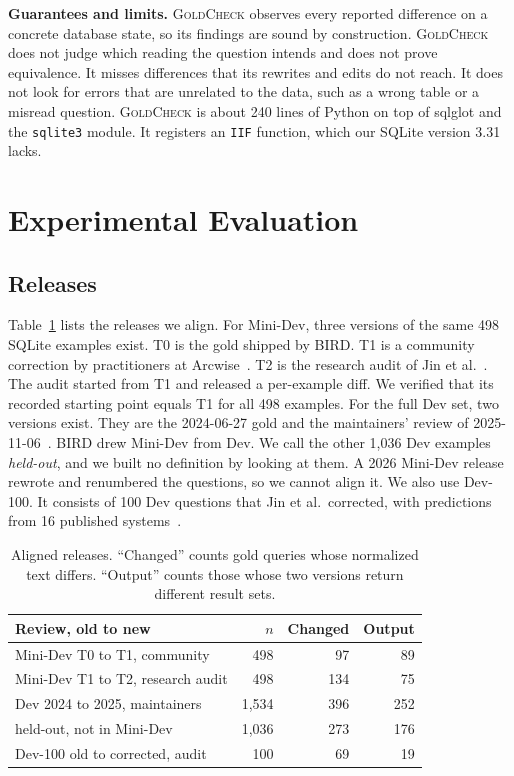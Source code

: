 \documentclass[conference]{IEEEtran}
\newcommand{\sys}{\textsc{GoldCheck}}
\begin{document}
\textbf{Guarantees and limits.} \sys{} observes every reported difference on a
concrete database state, so its findings are sound by construction. \sys{} does
not judge which reading the question intends and does not prove equivalence. It
misses differences that its rewrites and edits do not reach. It does not look
for errors that are unrelated to the data, such as a wrong table or a misread
question. \sys{} is about 240 lines of Python on top of sqlglot and the
\texttt{sqlite3} module. It registers an \texttt{IIF} function, which our SQLite
version 3.31 lacks.

\section{Experimental Evaluation}
\label{sec:eval}

\subsection{Releases}
Table~\ref{tab:corpus} lists the releases we align. For Mini-Dev, three
versions of the same 498 SQLite examples exist. T0 is the gold shipped by BIRD.
T1 is a community correction by practitioners at Arcwise~\cite{arcwise2024}. T2
is the research audit of Jin et al.~\cite{jin2026pervasive}. The audit started
from T1 and released a per-example diff. We verified that its recorded starting
point equals T1 for all 498 examples. For the full Dev set, two versions exist.
They are the 2024-06-27 gold and the maintainers' review of
2025-11-06~\cite{bird2025dev}. BIRD drew Mini-Dev from Dev. We call the other
1,036 Dev examples \emph{held-out}, and we built no definition by looking at
them. A 2026 Mini-Dev release~\cite{bird2026minidev} rewrote and renumbered the
questions, so we cannot align it. We also use Dev-100. It consists of 100 Dev
questions that Jin et al.\ corrected, with predictions from 16 published
systems~\cite{jin2026pervasive}.

\begin{table}[t]
\caption{Aligned releases. ``Changed'' counts gold queries whose normalized text
differs. ``Output'' counts those whose two versions return different result
sets.}
\label{tab:corpus}
\centering
\footnotesize
\begin{tabular}{@{}lrrr@{}}
\toprule
Review, old to new & $n$ & Changed & Output \\
\midrule
Mini-Dev T0 to T1, community & 498 & 97 & 89 \\
Mini-Dev T1 to T2, research audit & 498 & 134 & 75 \\
Dev 2024 to 2025, maintainers & 1,534 & 396 & 252 \\
\quad held-out, not in Mini-Dev & 1,036 & 273 & 176 \\
Dev-100 old to corrected, audit & 100 & 69 & 19 \\
\bottomrule
\end{tabular}
\end{table}
\end{document}
